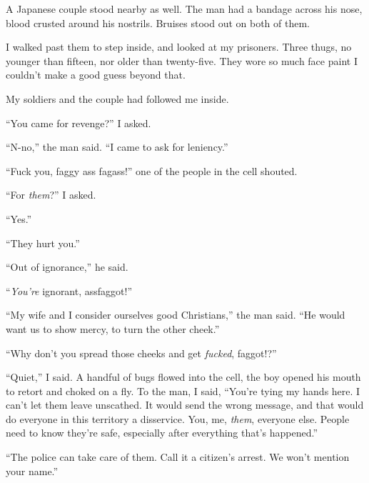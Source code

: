 A Japanese couple stood nearby as well.  The man had a bandage across his nose, blood crusted around his nostrils.  Bruises stood out on both of them.



I walked past them to step inside, and looked at my prisoners.  Three thugs, no younger than fifteen, nor older than twenty-five.  They wore so much face paint I couldn't make a good guess beyond that.



My soldiers and the couple had followed me inside.



``You came for revenge?'' I asked.



``N-no,'' the man said.  ``I came to ask for leniency.''



``Fuck you, faggy ass fagass!'' one of the people in the cell shouted.



``For \emph{them}?'' I asked.



``Yes.''



``They hurt you.''



``Out of ignorance,'' he said.



``\emph{You're} ignorant, assfaggot!''



``My wife and I consider ourselves good Christians,'' the man said.  ``He would want us to show mercy, to turn the other cheek.''



``Why don't you spread those cheeks and get \emph{fucked}, faggot!?''



``Quiet,'' I said.  A handful of bugs flowed into the cell, the boy opened his mouth to retort and choked on a fly.  To the man, I said, ``You're tying my hands here.  I can't let them leave unscathed.  It would send the wrong message, and that would do everyone in this territory a disservice.  You, me, \emph{them}, everyone else.  People need to know they're safe, especially after everything that's happened.''



``The police can take care of them.  Call it a citizen's arrest.  We won't mention your name.''



